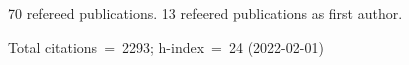 70 refereed publications. 13 refeered publications as first author.

Total citations~=~2293; h-index~=~24 (2022-02-01)
